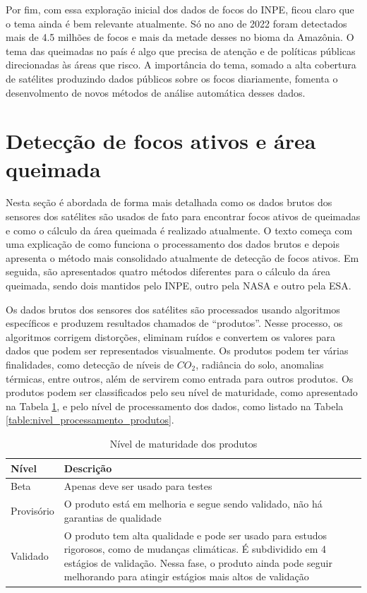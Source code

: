 \documentclass[cic,tc]{iiufrgs}
\begin{document}
Por fim, com essa exploração inicial dos dados de focos do INPE, ficou claro que o tema ainda é bem relevante atualmente. Só no ano de 2022 foram detectados mais de 4.5 milhões de focos e mais da metade desses no bioma da Amazônia. O tema das queimadas no país é algo que precisa de atenção e de políticas públicas direcionadas às áreas que risco. A importância do tema, somado a alta cobertura de satélites produzindo dados públicos sobre os focos diariamente, fomenta o desenvolmento de novos métodos de análise automática desses dados.

\section{Detecção de focos ativos e área queimada}
\label{sec:deteccao_focos_section}

Nesta seção é abordada de forma mais detalhada como os dados brutos dos sensores dos satélites são usados de fato para encontrar focos ativos de queimadas e como o cálculo da área queimada é realizado atualmente. O texto começa com uma explicação de como funciona o processamento dos dados brutos e depois apresenta o método mais consolidado atualmente de detecção de focos ativos. Em seguida, são apresentados quatro métodos diferentes para o cálculo da área queimada, sendo dois mantidos pelo INPE, outro pela NASA e outro pela ESA. 

Os dados brutos dos sensores dos satélites são processados usando algoritmos específicos e produzem resultados chamados de ``produtos''. Nesse processo, os algoritmos corrigem distorções, eliminam ruídos e convertem os valores para dados que podem ser representados visualmente. Os produtos podem ter várias finalidades, como detecção de níveis de $CO_2$, radiância do solo, anomalias térmicas, entre outros, além de servirem como entrada para outros produtos. Os produtos podem ser classificados pelo seu nível de maturidade, como apresentado na Tabela \ref{table:nivel_maturidade_produtos}, e pelo nível de processamento dos dados, como listado na Tabela \ref{table:nivel_processamento_produtos}.

\begin{table}[htbp]
\centering
\caption{Nível de maturidade dos produtos}
\begin{tabular}{ @{}lp{12cm}@{} }
  \toprule
  \textbf{Nível} & \textbf{Descrição} \\
  \midrule
  Beta & Apenas deve ser usado para testes \\
  Provisório & O produto está em melhoria e segue sendo validado, não há garantias de qualidade \\
  Validado & O produto tem alta qualidade e pode ser usado para estudos rigorosos, como de mudanças climáticas. É subdividido em 4 estágios de validação. Nessa fase, o produto ainda pode seguir melhorando para atingir estágios mais altos de validação \\
  \bottomrule
\end{tabular}
\label{table:nivel_maturidade_produtos}
\end{table}
\end{document}
